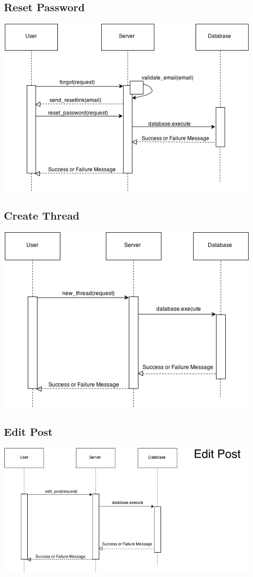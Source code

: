 \documentclass[12pt]{scrartcl}
\begin{document}
\subsection{Reset Password}
\includegraphics[keepaspectratio, scale=0.85]{sequence/reset.png}

\subsection{Create Thread}
\includegraphics[keepaspectratio, scale=0.85]{sequence/createthread.png}

\subsection{Edit Post}
\includegraphics[keepaspectratio, scale=0.9]{sequence/editpost.png}
\end{document}
